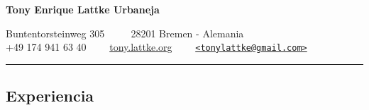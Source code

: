 \documentclass[10pt,letterpaper]{article}
\begin{document}
\date{Agosto, 2014}


\begin{center}
{\LARGE \textbf{Tony Enrique Lattke Urbaneja}}

Buntentorsteinweg 305  \ \ \textbullet
\ \  28201 Bremen - Alemania
\\
+49 174 941 63 40 \ \ \textbullet \ \  \href{http://tony.lattke.org}{tony.lattke.org} \ \ \textbullet \ \ \href{mailto:tonylattke@gmail.com}{\nolinkurl{<tonylattke@gmail.com>}}
\end{center}


\hrule
\vspace{-0.4em}
\subsection*{Experiencia}
\end{document}
